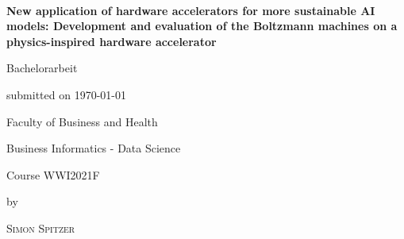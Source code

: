 \newcommand{\typMeinerArbeit}{Bachelorarbeit} 

\newcommand{\themaMeinerArbeit}{Mein Titel}

\newcommand{\meinName}{Simon Spitzer}

\thispagestyle{empty}

\begin{spacing}{1}
\begin{center}	
~\vspace{0mm}

{\sffamily
\LARGE  
\textbf{New application of hardware accelerators
for more sustainable AI models: Development and
evaluation of the Boltzmann machines on a
physics-inspired hardware accelerator}

\bigskip
\textbf{}
}


\vspace{15mm}

{\Large \typMeinerArbeit}

\vspace{1cm}

submitted on \today 

\vspace{15mm}

Faculty of Business and Health
\medskip

Business Informatics - Data Science
\medskip

Course WWI2021F

\vspace{10mm}

by

\vspace{10mm}

{\large\textsc{\meinName}}

\vspace{10mm}
\end{center}


\end{spacing}
